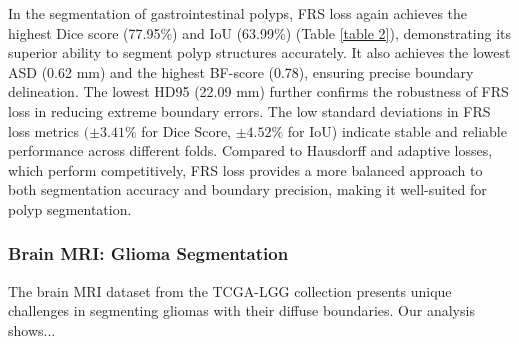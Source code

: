 \documentclass[review]{elsarticle}
\begin{document}
In the segmentation of gastrointestinal polyps, FRS loss again achieves the highest Dice score (77.95\%) and IoU (63.99\%) (Table \ref{table 2}), demonstrating its superior ability to segment polyp structures accurately. It also achieves the lowest ASD (0.62 mm) and the highest BF-score (0.78), ensuring precise boundary delineation. The lowest HD95 (22.09 mm) further confirms the robustness of FRS loss in reducing extreme boundary errors. The low standard deviations in FRS loss metrics \((\pm3.41\%\) for Dice Score, \(\pm4.52\%\) for IoU) indicate stable and reliable performance across different folds. Compared to Hausdorff and adaptive losses, which perform competitively, FRS loss provides a more balanced approach to both segmentation accuracy and boundary precision, making it well-suited for polyp segmentation.

\subsubsection{Brain MRI: Glioma Segmentation}
The brain MRI dataset from the TCGA-LGG collection presents unique challenges in segmenting gliomas with their diffuse boundaries. Our analysis shows...
\end{document}

